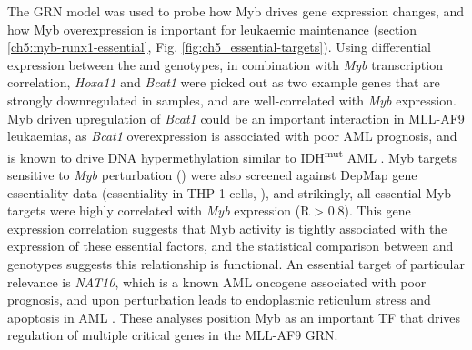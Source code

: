 The GRN model was used to probe how Myb drives gene expression changes, and how Myb overexpression is important for leukaemic maintenance \citep{zuber_integrated_2011} (section \ref{ch5:myb-runx1-essential}, Fig. \ref{fig:ch5_essential-targets}). Using differential expression between the \mybwt{} and \mybmre{} genotypes, in combination with \textit{Myb} transcription correlation, \textit{Hoxa11} and \textit{Bcat1} were picked out as two example genes that are strongly downregulated in \mybmre{} samples, and are well-correlated with \textit{Myb} expression. Myb driven upregulation of \textit{Bcat1} could be an important interaction in MLL-AF9 leukaemias, as \textit{Bcat1} overexpression is associated with poor AML prognosis, and is known to drive DNA hypermethylation similar to IDH\textsuperscript{mut} AML \citep{raffel_bcat1_2017}. Myb targets sensitive to \textit{Myb} perturbation (\mybmre{}) were also screened against DepMap gene essentiality data (essentiality in THP-1 cells, \cite{meyers_computational_2017, doench_optimized_2016}), and strikingly, all essential Myb targets were highly correlated with \textit{Myb} expression (R > 0.8). This gene expression correlation suggests that Myb activity is tightly associated with the expression of these essential factors, and the statistical comparison between \mybwt{} and \mybmre{} genotypes suggests this relationship is functional. An essential target of particular relevance is \textit{NAT10}, which is a known AML oncogene associated with poor prognosis, and upon perturbation leads to endoplasmic reticulum stress and apoptosis in AML \citep{zi_targeting_2020, liang_nat10_2020}. These analyses position Myb as an important TF that drives regulation of multiple critical genes in the MLL-AF9 GRN.






